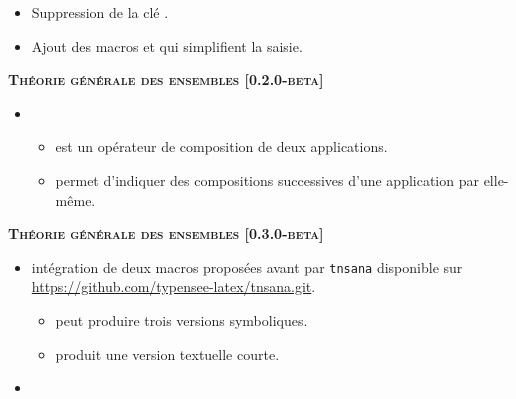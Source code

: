 \documentclass[12pt,a4paper]{book}
\begin{document}
\begin{description}
\begin{itemize}[itemsep=.5em]
\begin{itemize}[itemsep=.5em]
        \item Suppression de la clé .
        
        \item Ajout des macros  et  qui simplifient la saisie.
    \end{itemize}
\end{itemize}


\separation




\begin{center}
    \textbf{\textsc{Théorie générale des ensembles [0.2.0-beta]}}
\end{center}

\begin{itemize}[itemsep=.5em]
    \item {}
    \begin{itemize}[itemsep=.5em]
        \item {} est un opérateur de composition de deux applications.

        \item {} permet d'indiquer des compositions successives d'une application par elle-même.
    \end{itemize}
\end{itemize}


\begin{center}
    \textbf{\textsc{Théorie générale des ensembles [0.3.0-beta]}}
\end{center}

\begin{itemize}[itemsep=.5em]
    \item {}
          intégration de deux macros proposées avant par \verb#tnsana# disponible sur \url{https://github.com/typensee-latex/tnsana.git}.

    \begin{itemize}[itemsep=.5em]
        \item {} peut produire trois versions symboliques.

        \item {} produit une version textuelle courte.
    \end{itemize}


    \item {}


\end{itemize}
\end{description}
\end{document}
